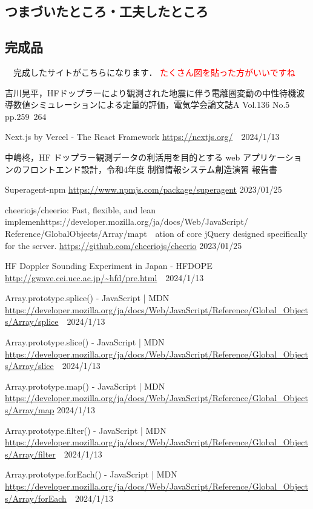 
\subsection{つまづいたところ・工夫したところ}

\subsection{完成品}
　完成したサイトがこちらになります．
\textcolor{red}{たくさん図を貼った方がいいですね}
\small
\begin{thebibliography}{99}
\setlength{\itemsep}{0pt}
\smallskip

吉川晃平，HFドップラーにより観測された地震に伴う電離圏変動の中性待機波導数値シミュレーションによる定量的評価，電気学会論文誌A Vol.136 No.5 pp.259~264

Next.js by Vercel - The React Framework
\url{https://nextjs.org/}　2024/1/13

中嶋柊，HF ドップラー観測データの利活用を目的とする web アプリケーションのフロントエンド設計，令和4年度 制御情報システム創造演習 報告書

Superagent-npm 
\url{https://www.npmjs.com/package/superagent}  2023/01/25

cheeriojs/cheerio: Fast, flexible, and lean implemenhttps://developer.mozilla.org/ja/docs/Web/JavaScript/
Reference/GlobalObjects/Array/mapt　ation of core jQuery designed specifically for the server. 
\url{https://github.com/cheeriojs/cheerio}  2023/01/25 

HF Doppler Sounding Experiment in Japan - HFDOPE
\url{http://gwave.cei.uec.ac.jp/~hfd/pre.html}　2024/1/13

Array.prototype.splice() - JavaScript | MDN
\url{https://developer.mozilla.org/ja/docs/Web/JavaScript/Reference/Global_Objects/Array/splice}　2024/1/13

Array.prototype.slice() - JavaScript | MDN
\url{https://developer.mozilla.org/ja/docs/Web/JavaScript/Reference/Global_Objects/Array/slice}　2024/1/13

Array.prototype.map() - JavaScript | MDN
\url{https://developer.mozilla.org/ja/docs/Web/JavaScript/Reference/Global_Objects/Array/map}
2024/1/13

Array.prototype.filter() - JavaScript | MDN
\url{https://developer.mozilla.org/ja/docs/Web/JavaScript/Reference/Global_Objects/Array/filter}　2024/1/13

Array.prototype.forEach() - JavaScript | MDN
\url{https://developer.mozilla.org/ja/docs/Web/JavaScript/Reference/Global_Objects/Array/forEach}　2024/1/13

\end{thebibliography}
\normalsize
